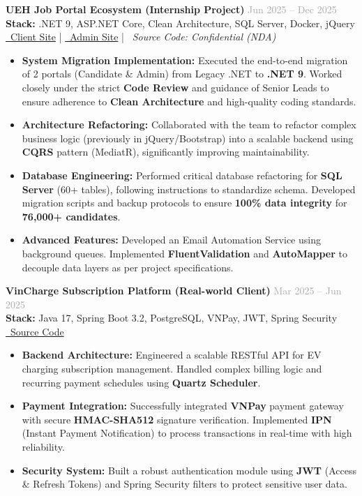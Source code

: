 \documentclass[10pt,a4paper]{article}
\newcommand{\projectitem}[5]{
    \noindent\begin{tcolorbox}[
        colback=white,
        colframe=lightgray,
        boxrule=0.5pt,
        arc=2pt,
        top=5pt, bottom=5pt, left=6pt, right=6pt
    ]
        \noindent\textbf{\color{primary}#1} \hfill \textcolor{darkgray}{\small #2}\\[2pt]
        {\small\textbf{Stack:} #3}\\[2pt]
        {\footnotesize\color{darkgray}#4}
        \vspace{3pt}
        #5
    \end{tcolorbox}
    \vspace{4pt}
}
\begin{document}
\projectitem{UEH Job Portal Ecosystem (Internship Project)}{Jun 2025 -- Dec 2025}
{.NET 9, ASP.NET Core, Clean Architecture, SQL Server, Docker, jQuery}
{\href{https://vieclam.ueh.edu.vn/}{\faGlobe \ Client Site} | \href{https://vieclamadmin.ueh.edu.vn/}{\faGlobe \ Admin Site} | \faLock \ \textit{Source Code: Confidential (NDA)}}
{\begin{itemize}[leftmargin=12pt,itemsep=2pt,topsep=3pt,label={•}]
    \item \textbf{System Migration Implementation:} Executed the end-to-end migration of 2 portals (Candidate \& Admin) from Legacy .NET to \textbf{.NET 9}. Worked closely under the strict \textbf{Code Review} and guidance of Senior Leads to ensure adherence to \textbf{Clean Architecture} and high-quality coding standards.
    \item \textbf{Architecture Refactoring:} Collaborated with the team to refactor complex business logic (previously in jQuery/Bootstrap) into a scalable backend using \textbf{CQRS} pattern (MediatR), significantly improving maintainability.
    \item \textbf{Database Engineering:} Performed critical database refactoring for \textbf{SQL Server} (60+ tables), following instructions to standardize schema. Developed migration scripts and backup protocols to ensure \textbf{100\% data integrity} for \textbf{76,000+ candidates}.
    \item \textbf{Advanced Features:} Developed an Email Automation Service using background queues. Implemented \textbf{FluentValidation} and \textbf{AutoMapper} to decouple data layers as per project specifications.
\end{itemize}}

\projectitem{VinCharge Subscription Platform (Real-world Client)}{Mar 2025 -- Jun 2025}
{Java 17, Spring Boot 3.2, PostgreSQL, VNPay, JWT, Spring Security}
{\href{https://github.com/dungken/vincharge-subscription}{\faGithub \ Source Code}}
{\begin{itemize}[leftmargin=12pt,itemsep=2pt,topsep=3pt,label={•}]
    \item \textbf{Backend Architecture:} Engineered a scalable RESTful API for EV charging subscription management. Handled complex billing logic and recurring payment schedules using \textbf{Quartz Scheduler}.
    \item \textbf{Payment Integration:} Successfully integrated \textbf{VNPay} payment gateway with secure \textbf{HMAC-SHA512} signature verification. Implemented \textbf{IPN} (Instant Payment Notification) to process transactions in real-time with high reliability.
    \item \textbf{Security System:} Built a robust authentication module using \textbf{JWT} (Access \& Refresh Tokens) and Spring Security filters to protect sensitive user data.
\end{itemize}}
\end{document}
